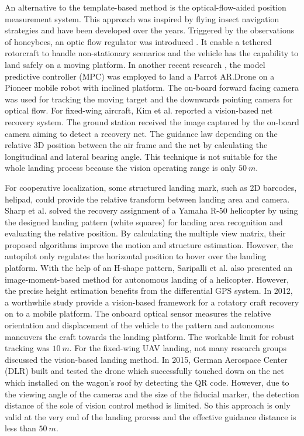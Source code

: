 An alternative to the template-based method is the optical-flow-aided position measurement system. This approach was inspired by flying insect navigation strategies and have been developed over the years. Triggered by the observations of honeybees, an optic flow regulator was introduced \cite{Ruffier2015}. It enable a tethered rotorcraft to handle non-stationary scenarios and the vehicle has the capability to land safely on a moving platform. In another recent research \cite{Vlantis2015}, the model predictive controller (MPC) was employed to land a Parrot AR.Drone on a Pioneer mobile robot with inclined platform. The on-board forward facing camera was used for tracking the moving target and the downwards pointing camera for optical flow. For fixed-wing aircraft, Kim et al.\cite{Kim2013} reported a vision-based net recovery system. The ground station received the image captured by the on-board camera aiming to detect a recovery net. The guidance law depending on the relative 3D position between the air frame and the net by calculating the longitudinal and lateral bearing angle. This technique is not suitable for the whole landing process because the vision operating range is only $50\ m$.



For cooperative localization, some structured landing mark, such as 2D barcodes, helipad, could provide the relative transform between landing area and camera. Sharp et al. \cite{Sharp2001} solved the recovery assignment of a Yamaha R-50 helicopter by using the designed landing pattern (white squares) for landing area recognition and evaluating the relative position. By calculating the multiple view matrix, their proposed algorithms\cite{Shakernia2002} improve the motion and structure estimation. However, the autopilot only regulates the horizontal position to hover over the landing platform. With the help of an H-shape pattern, Saripalli et al. \cite{Saripalli2003} also presented an image-moment-based method for autonomous landing of a helicopter. However, the precise height estimation benefits from the differential GPS system. In 2012, a worthwhile study \cite{richardsonautomated2013} provide a vision-based framework for a rotatory craft recovery on to a mobile platform. The onboard optical sensor measures the relative orientation and displacement of the vehicle to the pattern and autonomous maneuvers the craft towards the landing platform. The workable limit for robust tracking was $10\ m$. For the fixed-wing UAV landing, not many research groups discussed the vision-based landing method. In 2015, German Aerospace Center (DLR) built and tested the drone which successfully touched down on the net which installed on the wagon's roof by detecting the QR code\cite{DLR_Landing}. However, due to the viewing angle of the cameras and the size of the fiducial marker, the detection distance of the sole of vision control method is limited. So this approach  is only valid at the very end of the landing process and the effective guidance distance is less than $50\ m$. 


